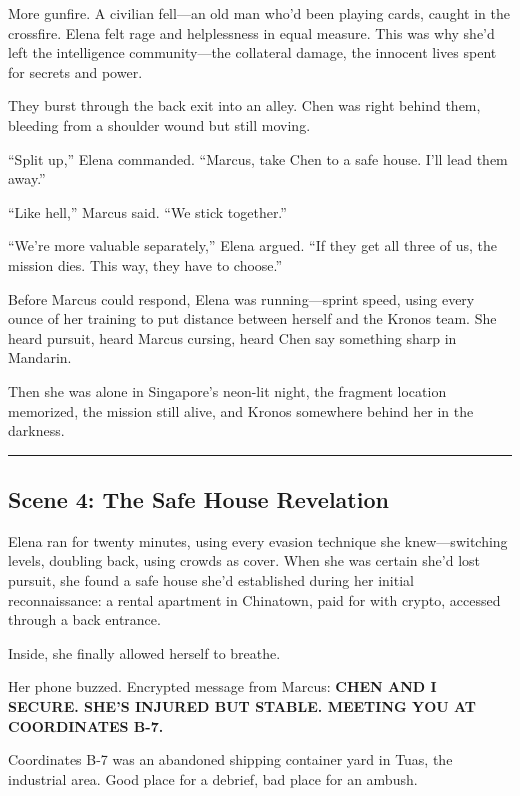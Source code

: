 More gunfire. A civilian fell---an old man who'd been playing cards, caught in the crossfire. Elena felt rage and helplessness in equal measure. This was why she'd left the intelligence community---the collateral damage, the innocent lives spent for secrets and power.

They burst through the back exit into an alley. Chen was right behind them, bleeding from a shoulder wound but still moving.

``Split up,'' Elena commanded. ``Marcus, take Chen to a safe house. I'll lead them away.''

``Like hell,'' Marcus said. ``We stick together.''

``We're more valuable separately,'' Elena argued. ``If they get all three of us, the mission dies. This way, they have to choose.''

Before Marcus could respond, Elena was running---sprint speed, using every ounce of her training to put distance between herself and the Kronos team. She heard pursuit, heard Marcus cursing, heard Chen say something sharp in Mandarin.

Then she was alone in Singapore's neon-lit night, the fragment location memorized, the mission still alive, and Kronos somewhere behind her in the darkness.

\begin{center}\rule{0.5\linewidth}{0.5pt}\end{center}

\hypertarget{scene-4-the-safe-house-revelation}{%
\subsection{Scene 4: The Safe House Revelation}\label{scene-4-the-safe-house-revelation}}

Elena ran for twenty minutes, using every evasion technique she knew---switching levels, doubling back, using crowds as cover. When she was certain she'd lost pursuit, she found a safe house she'd established during her initial reconnaissance: a rental apartment in Chinatown, paid for with crypto, accessed through a back entrance.

Inside, she finally allowed herself to breathe.

Her phone buzzed. Encrypted message from Marcus: \textbf{CHEN AND I SECURE. SHE'S INJURED BUT STABLE. MEETING YOU AT COORDINATES B-7.}

Coordinates B-7 was an abandoned shipping container yard in Tuas, the industrial area. Good place for a debrief, bad place for an ambush.

